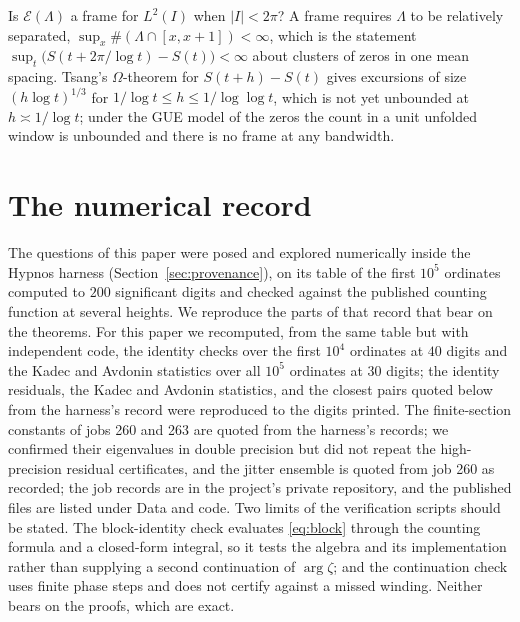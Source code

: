 \documentclass[11pt]{article}
\newcommand{\Lam}{\Lambda}
\newcommand{\E}{\mathcal{E}}
\begin{document}
\begin{question}
Is $\E(\Lam)$ a frame for $L^2(I)$ when $|I|<2\pi$? A frame requires $\Lam$ to be relatively separated, $\sup_x\#(\Lam\cap[x,x+1])<\infty$, which is the statement $\sup_t\bigl(S(t+2\pi/\log t)-S(t)\bigr)<\infty$ about clusters of zeros in one mean spacing. Tsang's $\Omega$-theorem for $S(t+h)-S(t)$ \cite[Theorem 3]{Tsang86} gives excursions of size $(h\log t)^{1/3}$ for $1/\log t\le h\le1/\log\log t$, which is not yet unbounded at $h\asymp1/\log t$; under the GUE model of the zeros the count in a unit unfolded window is unbounded and there is no frame at any bandwidth.
\end{question}

\section{The numerical record}\label{sec:numerics}

The questions of this paper were posed and explored numerically inside the Hypnos harness (Section~\ref{sec:provenance}), on its table of the first $10^5$ ordinates computed to $200$ significant digits and checked against the published counting function at several heights. We reproduce the parts of that record that bear on the theorems. For this paper we recomputed, from the same table but with independent code, the identity checks over the first $10^4$ ordinates at $40$ digits and the Kadec and Avdonin statistics over all $10^5$ ordinates at $30$ digits; the identity residuals, the Kadec and Avdonin statistics, and the closest pairs quoted below from the harness's record were reproduced to the digits printed. The finite-section constants of jobs 260 and 263 are quoted from the harness's records; we confirmed their eigenvalues in double precision but did not repeat the high-precision residual certificates, and the jitter ensemble is quoted from job 260 as recorded; the job records are in the project's private repository, and the published files are listed under Data and code. Two limits of the verification scripts should be stated. The block-identity check evaluates \eqref{eq:block} through the counting formula and a closed-form integral, so it tests the algebra and its implementation rather than supplying a second continuation of $\arg\zeta$; and the continuation check uses finite phase steps and does not certify against a missed winding. Neither bears on the proofs, which are exact.
\end{document}
